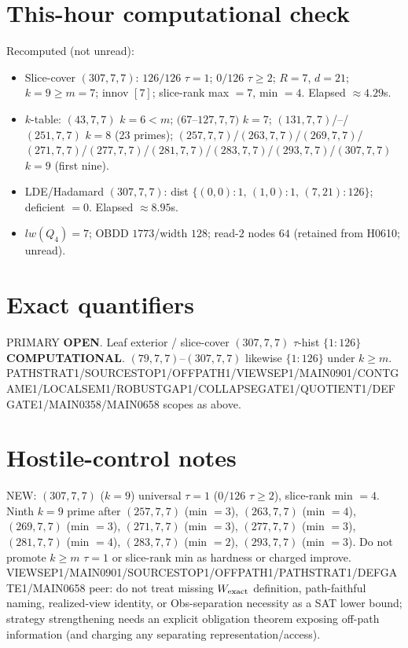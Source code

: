 \documentclass[11pt]{article}
\begin{document}
\section*{This-hour computational check}
Recomputed (not unread):
\begin{itemize}
\item Slice-cover $(307,7,7)$: $126/126$ $\tau{=}1$; $0/126$ $\tau{\ge}2$; $R{=}7$, $d{=}21$;
  $k{=}9{\ge}m{=}7$; innov $[7]$; slice-rank max $=7$, min $=4$. Elapsed $\approx4.29$s.
\item $k$-table: $(43,7,7)$ $k{=}6{<}m$; $(67$--$127,7,7)$ $k{=}7$;
  $(131,7,7)$/--/$(251,7,7)$ $k{=}8$ (23 primes); $(257,7,7)$/$(263,7,7)$/$(269,7,7)$/$(271,7,7)$/$(277,7,7)$/$(281,7,7)$/$(283,7,7)$/$(293,7,7)$/$(307,7,7)$ $k{=}9$ (first nine).
\item LDE/Hadamard $(307,7,7)$: dist $\{(0,0){:}1,\,(1,0){:}1,\,(7,21){:}126\}$; deficient $=0$. Elapsed $\approx8.95$s.
\item $lw(Q_4)=7$; OBDD $1773$/width $128$; read-$2$ nodes $64$ (retained from H0610; unread).
\end{itemize}

\section*{Exact quantifiers}
PRIMARY \textbf{OPEN}. Leaf exterior / slice-cover $(307,7,7)$ $\tau$-hist $\{1{:}126\}$ \textbf{COMPUTATIONAL}.
$(79,7,7)$--$(307,7,7)$ likewise $\{1{:}126\}$ under $k{\ge}m$.
PATHSTRAT1/SOURCESTOP1/OFFPATH1/VIEWSEP1/MAIN0901/CONTGAME1/LOCALSEM1/ROBUSTGAP1/COLLAPSEGATE1/QUOTIENT1/DEFGATE1/MAIN0358/MAIN0658 scopes as above.

\section*{Hostile-control notes}
NEW: $(307,7,7)$ ($k{=}9$) universal $\tau{=}1$ ($0/126$ $\tau{\ge}2$), slice-rank min $=4$.
Ninth $k{=}9$ prime after $(257,7,7)$ (min $=3$), $(263,7,7)$ (min $=4$), $(269,7,7)$ (min $=3$), $(271,7,7)$ (min $=3$), $(277,7,7)$ (min $=3$), $(281,7,7)$ (min $=4$), $(283,7,7)$ (min $=2$), $(293,7,7)$ (min $=3$).
Do not promote $k{\ge}m$ $\tau{=}1$ or slice-rank min as hardness or charged improve.
VIEWSEP1/MAIN0901/SOURCESTOP1/OFFPATH1/PATHSTRAT1/DEFGATE1/MAIN0658 peer: do not treat missing $W_{\rm exact}$ definition,
path-faithful naming, realized-view identity, or Obs-separation necessity as a SAT lower bound;
strategy strengthening needs an explicit obligation theorem exposing off-path information
(and charging any separating representation/access).
\end{document}
